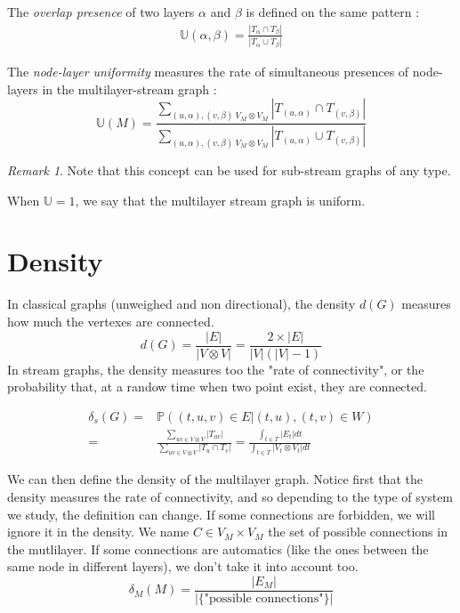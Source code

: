 \documentclass[dvipsnames,a4paper,11pt]{article}
\theoremstyle{definition}
\theoremstyle{remark}
\newtheorem{rmq}{Remark}
\theoremstyle{remark}
\begin{document}
	The {\em overlap presence} of two layers $\alpha$ and $\beta$ is defined on the same pattern :
	\begin{align*}
		\mathbb{U}(\alpha,\beta) = \frac{|T_{\alpha}\cap T_{\beta}|}{|T_{\alpha}\cup T_{\beta}|}
	\end{align*}

    The {\em node-layer uniformity} measures the rate of simultaneous presences of node-layers in the multilayer-stream graph :
    \[
    	\mathbb{U}(M) = \frac{\sum_{(u,\alpha),(v,\beta) \ V_M \otimes V_M}{|T_{(u,\alpha)} \cap T_{(v,\beta)}|}}{\sum_{(u,\alpha),(v,\beta) \ V_M \otimes V_M}{|T_{(u,\alpha)}\cup T_{(v,\beta)}|}}
    \]



	\begin{rmq}
		Note that this concept can be used for sub-stream graphs of any type.
	\end{rmq}

	When $\mathbb{U}=1$, we say that the multilayer stream graph is uniform.



    \section{Density}
	In classical graphs (unweighed and non directional), the density $d(G)$ measures how much the vertexes are connected.
		\[
			d(G) = \frac{|E|}{|V\otimes V|} = \frac{2\times |E|}{|V|(|V|-1)}
		\]
	In stream graphs, the density measures too the "rate of connectivity", or the probability that, at a randow time when two point exist, they are connected.

		\begin{align*}
			\delta_s(G) = & \mathbb{P}((t,u,v)\in E| (t,u),(t,v) \in W) \\
			 =  & \frac{\sum_{uv \in V \otimes V}{|T_{uv}|}}{\sum_{uv \in V\otimes V}{|T_u\cap T_v|}}= \frac{\int_{t\in T}{|E_t|dt}}{\int_{t\in T}{|V_t\otimes V_t|dt}}
		\end{align*}

	We can then define the density of the multilayer graph. Notice first that the density measures the rate of connectivity, and so depending to the type of system we study, the definition can change. If some connections are forbidden, we will ignore it in the density. We name $C \in V_M\times V_M$ the set of possible connections in the mutlilayer. If some connections are automatics (like the ones between the same node in different layers), we don't take it into account too.
	\[
		\delta_M (M) = \frac{|E_M|}{|\{\text{"possible connections"}\}|}
	\]
\end{document}
